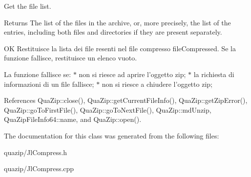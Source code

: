 Get the file list. 

\begin{DoxyReturn}{Returns}
The list of the files in the archive, or, more precisely, the list of the entries, including both files and directories if they are present separately.
\end{DoxyReturn}
OK Restituisce la lista dei file resenti nel file compresso fileCompressed. Se la funzione fallisce, restituisce un elenco vuoto.

La funzione fallisce se: $\ast$ non si riesce ad aprire l'oggetto zip; $\ast$ la richiesta di informazioni di un file fallisce; $\ast$ non si riesce a chiudere l'oggetto zip; 

References QuaZip::close(), QuaZip::getCurrentFileInfo(), QuaZip::getZipError(), QuaZip::goToFirstFile(), QuaZip::goToNextFile(), QuaZip::mdUnzip, QuaZipFileInfo64::name, and QuaZip::open().



The documentation for this class was generated from the following files:\begin{DoxyCompactItemize}
\item 
quazip/JlCompress.h\item 
quazip/JlCompress.cpp\end{DoxyCompactItemize}
